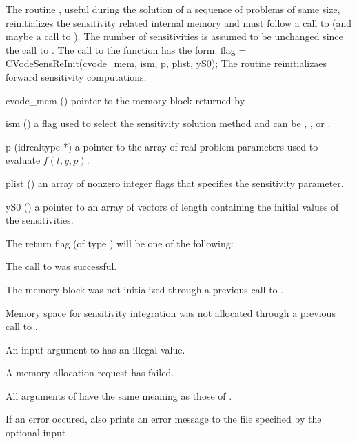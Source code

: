 The routine , useful during the solution of a sequence of problems of 
same size, reinitializes the sensitivity related internal memory 
and must follow a call to  (and maybe a call to ). 
The number  of sensitivities is assumed to be unchanged since the call to 
.
The call to the  function has the form:
{
  flag = CVodeSensReInit(cvode\_mem, ism, p, plist, yS0);
}
{
  The routine  reinitializaes forward sensitivity computations.
}
{
  \begin{args}

  \item[cvode\_mem] ()
    pointer to the {\cvodes} memory block returned by .

  \item[ism] ()
    a flag used to select the sensitivity solution method and can 
    be , , or .

  \item[p] (id{realtype *})
    a pointer to the array of real problem parameters used to evaluate $f(t,y,p)$.
    
  \item[plist] () 
    an array of  nonzero integer flags that specifies the sensitivity parameter.
    
  \item[yS0] () 
    a pointer to an array of  vectors of length  containing the initial 
    values of the sensitivities.

  \end{args}
}
{
  The return flag  (of type ) will be one of the following:
  \begin{args}
  \item[\Id{SUCCESS}]
    The call to  was successful.
  \item[\Id{SCVREI\_NO\_MEM}] 
    The {\cvodes} memory block was not initialized through a 
    previous call to .
  \item[\Id{SCVREI\_NO\_SENSI}]
    Memory space for sensitivity integration was not allocated through a 
    previous call to .
  \item[\Id{SCVREI\_ILL\_INPUT}] 
    An input argument to  has an illegal value.    
  \item[\Id{SCVREI\_MEM\_FAIL}] 
    A memory allocation request has failed.
  \end{args}
}
{
  All arguments of  have the same meaning as those of
  .

  If an error occured,  also prints an error message to the
  file specified by the optional input .
}

